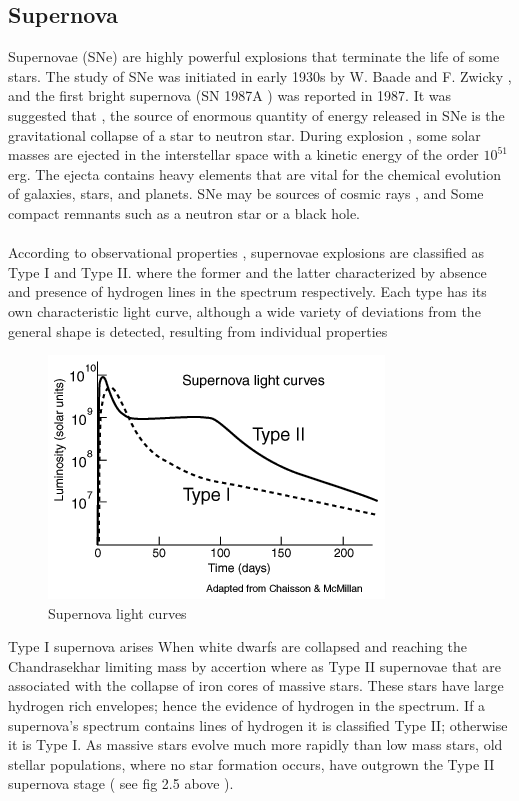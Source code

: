 \subsection{Supernova}
Supernovae (SNe) are  highly  powerful   explosions  that  terminate  the  life of some  stars. The  study of SNe  was  initiated  in  early  1930s  by W. Baade and F. Zwicky , and  the  first  bright  supernova (SN 1987A ) was  reported  in  1987. It was  suggested  that , the  source  of  enormous   quantity  of  energy  released in  SNe  is  the   gravitational  collapse  of  a star  to   neutron  star. During explosion , some  solar  masses  are   ejected  in  the  interstellar  space  with  a kinetic  energy  of  the  order  $ 10^{51} $ erg.  The  ejecta  contains  heavy  elements  that  are  vital  for  the  chemical  evolution  of  galaxies, stars, and planets. SNe  may  be   sources  of  cosmic  rays , and   Some  compact  remnants such  as   a neutron  star  or  a black  hole.\citep{24} \\\\
According to observational  properties , supernovae   explosions  are  classified  as  Type I and  Type II.  where the former and the latter characterized by absence  and presence  of hydrogen lines in  the  spectrum  respectively. Each type has its own  characteristic  light  curve, although  a wide  variety  of  deviations from the general shape is detected, resulting from individual properties 
\begin{figure}[h]
\begin{center}
\includegraphics[scale=0.6]{Figures/SN.png}
\caption{Supernova light curves}
\end{center}
\end{figure} 
Type I  supernova  arises  When white dwarfs are  collapsed  and  reaching   the Chandrasekhar  limiting  mass by accertion where as  Type II  supernovae  that  are  associated  with  the  collapse  of iron cores  of  massive  stars. These  stars  have  large  hydrogen  rich  envelopes; hence  the  evidence  of  hydrogen  in  the  spectrum.  If  a supernova’s  spectrum contains  lines  of  hydrogen  it  is  classified  Type  II; otherwise  it is Type I. As  massive  stars  evolve  much  more  rapidly than low mass  stars, old  stellar populations, where no star formation occurs, have  outgrown  the  Type II supernova stage  ( see fig 2.5 above ). \citep{24}\citep{25}\\\\
